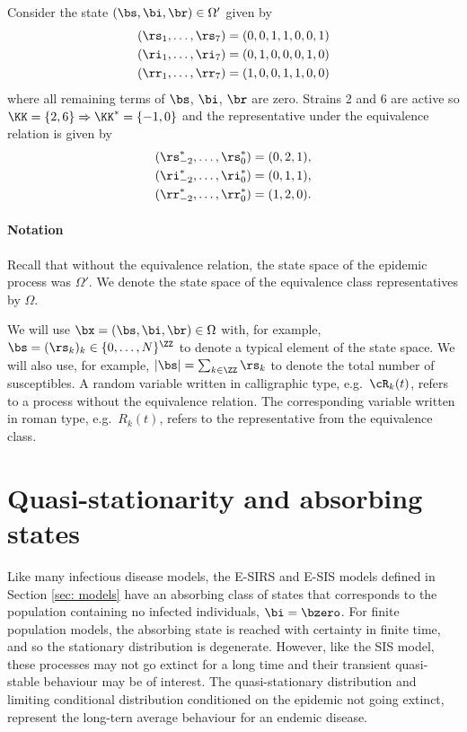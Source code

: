 \documentclass[review]{elsarticle}
\begin{document}
\begin{example}
	Consider the state $(\bs, \bi, \br) \in \Omega'$ 
	given by
	\begin{align*}
		(\rs_1, \dots, \rs_7) &= (0,0,1,1,0,0,1) \\
		(\ri_1, \dots, \ri_7) &= (0,1,0,0,0,1,0) \\
		(\rr_1, \dots, \rr_7) &= (1,0,0,1,1,0,0)
	\end{align*}
	where all remaining terms of $\bs$, $\bi$, $\br$ are zero. Strains 2 and 6 are active so $\KK = \{2, 6\} \Rightarrow \KK^* = \{-1,0\}$
	and the representative under the equivalence relation is
	given by
	\begin{align*}
		(\rs^*_{-2}, \dots, \rs^*_0) &= (0,2,1), \\
		(\ri^*_{-2}, \dots, \ri^*_0) &= (0,1,1), \\
		(\rr^*_{-2}, \dots, \rr^*_0) &= (1,2,0).
	\end{align*}
\end{example}


\paragraph{Notation}\label{para: notation}
Recall that without the equivalence relation, the state space of the epidemic process was $\Omega'$. We denote the state space of the equivalence class representatives by $\Omega$. 

We will use $\bx = (\bs, \bi, \br) \in \Omega$ with, for example, $\bs = (\rs_k)_k \in \{0,\dots,N\}^{\ZZ}$ to denote a typical element of the state space. We will also use, for example, $|\bs| = \sum_{k \in \ZZ} \rs_k$ to denote the total number of susceptibles. A random variable written in calligraphic type, e.g.\ $\cR_k(t)$, refers to a process without the equivalence relation. The corresponding variable written in roman type, e.g.\ $R_k(t)$, refers to the representative from the equivalence class.

\section{Quasi-stationarity and absorbing states}\label{sec: qsd evo}

Like many infectious disease models, the E-SIRS and E-SIS models defined in Section \ref{sec: models} have an absorbing class of states that corresponds to the population containing no infected individuals, $\bi=\bzero$. For finite population models, the absorbing state is reached with certainty in finite time, and so the stationary distribution is degenerate. However, like the SIS model, these processes may not go extinct for a long time and their transient quasi-stable behaviour may be of interest. The quasi-stationary distribution and limiting conditional distribution conditioned on the epidemic not going extinct, represent the long-tern average behaviour for an endemic disease. 
\end{document}
